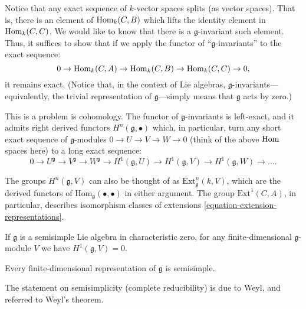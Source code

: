 Notice that any exact sequence of $k$-vector spaces splits (as vector spaces). That is, there is an element of $\mathop{\rm Hom}\nolimits_k(C,B)$ which lifts the identity element in $\mathop{\rm Hom}\nolimits_k(C,C)$. We would like to know that there is a $\mathfrak g$-invariant such element. Thus, it suffices to show that if we apply the functor of ``$\mathfrak g$-invariants'' to the exact sequence:
$$0\to \mathop{\rm Hom}\nolimits_k(C,A)\to \mathop{\rm Hom}\nolimits_k(C,B) \to \mathop{\rm Hom}\nolimits_k(C,C) \to 0,$$
it remains exact. (Notice that, in the context of Lie algebras, $\mathfrak g$-invariants---equivalently, the trivial representation of $\mathfrak g$---simply means that $\mathfrak g$ acts by zero.)

This is a problem is cohomology. The functor of $\mathfrak g$-invariants is left-exact, and it admits right derived functors $H^n(\mathfrak g, \bullet)$ which, in particular, turn any short exact sequence of $\mathfrak g$-modules $0\to U\to V\to W\to 0$ (think of the above $\mathop{\rm Hom}\nolimits$ spaces here) to a long exact sequence:
$$0\to U^{\mathfrak g}\to V^{\mathfrak g}\to W^{\mathfrak g}\to H^1(\mathfrak g, U)\to H^1(\mathfrak g, V)\to H^1(\mathfrak g, W)\to \dots.$$

The groups $H^n(\mathfrak g, V)$ can also be thought of as $\text{Ext}^n_{\mathfrak g}(k, V)$, which are the derived functors of $\text{Hom}_{\mathfrak g}(\bullet , \bullet)$ in either argument. The group $\text{Ext}^1(C,A)$, in particular, describes isomorphism classes of extensions \eqref{equation-extension-representations}. 





\begin{theorem}
\label{theorem-complete-reducibility}
 If $\mathfrak g$ is a semisimple Lie algebra in characteristic zero, for any finite-dimensional $\mathfrak g$-module $V$ we have $H^1(\mathfrak g,V)=0$.
 
 Every finite-dimensional representation of $\mathfrak g$ is semisimple.
\end{theorem}

The statement on semisimplicity (complete reducibility) is due to Weyl, and referred to Weyl's theorem.

